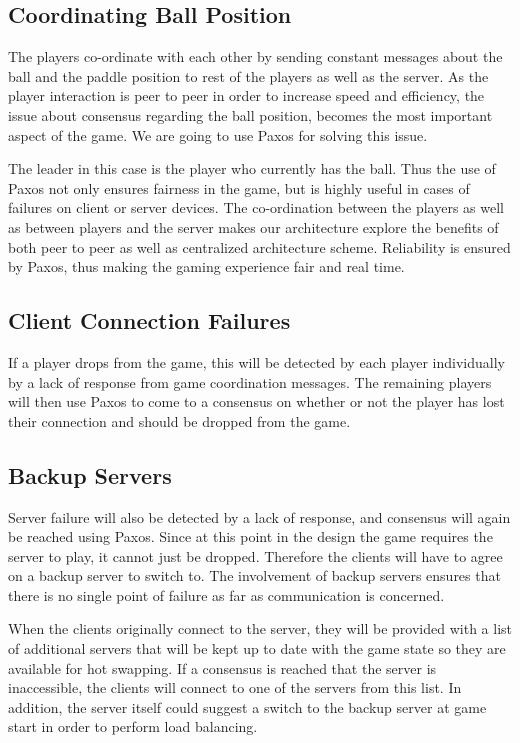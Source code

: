 \documentclass{sig-alternate}
\begin{document}
\subsection{Coordinating Ball Position}

The players co-ordinate with each other by sending constant messages about
the ball and the paddle position to rest of the players as well as the
server. As the player interaction is peer to peer in order to increase
speed and efficiency, the issue about consensus regarding the ball
position, becomes the most important aspect of the game. We are going to
use Paxos\cite{lamport:paxos} for solving this issue.

The leader in this case is the player who currently has the ball. Thus the
use of Paxos not only ensures fairness in the game, but is highly useful in
cases of failures on client or server devices. The co-ordination between
the players as well as between players and the server makes our
architecture explore the benefits of both peer to peer as well as
centralized architecture scheme.  Reliability is ensured by Paxos, thus
making the gaming experience fair and real time.

\subsection{Client Connection Failures}

If a player drops from the game, this will be detected by each player
individually by a lack of response from game coordination messages. The
remaining players will then use Paxos to come to a consensus on whether or
not the player has lost their connection and should be dropped from the
game.

\subsection{Backup Servers}

Server failure will also be detected by a lack of response, and consensus
will again be reached using Paxos.  Since at this point in the design the
game requires the server to play, it cannot just be dropped.  Therefore the
clients will have to agree on a backup server to switch to.  The
involvement of backup servers ensures that there is no single point of
failure as far as communication is concerned.

When the clients originally connect to the server, they will be provided
with a list of additional servers that will be kept up to date with the
game state so they are available for hot swapping.  If a consensus is
reached that the server is inaccessible, the clients will connect to one of
the servers from this list.  In addition, the server itself could suggest a
switch to the backup server at game start in order to perform load
balancing.
\end{document}
